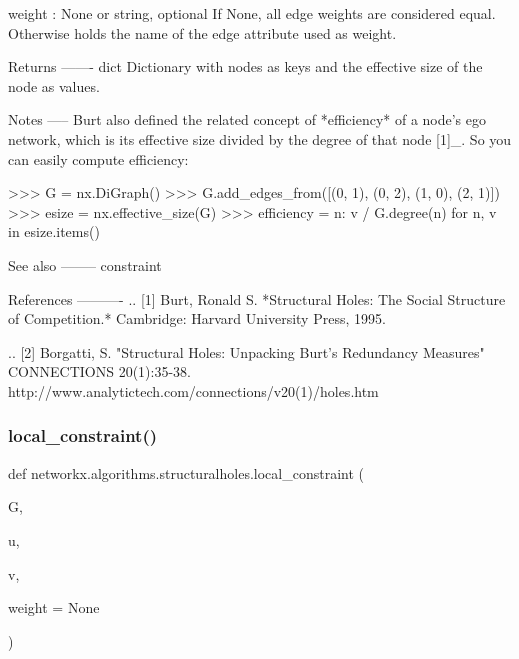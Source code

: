 \begin{DoxyVerb}
weight : None or string, optional
  If None, all edge weights are considered equal.
  Otherwise holds the name of the edge attribute used as weight.

Returns
-------
dict
    Dictionary with nodes as keys and the effective size of the node as values.

Notes
-----
Burt also defined the related concept of *efficiency* of a node's ego
network, which is its effective size divided by the degree of that
node [1]_. So you can easily compute efficiency:

>>> G = nx.DiGraph()
>>> G.add_edges_from([(0, 1), (0, 2), (1, 0), (2, 1)])
>>> esize = nx.effective_size(G)
>>> efficiency = {n: v / G.degree(n) for n, v in esize.items()}

See also
--------
constraint

References
----------
.. [1] Burt, Ronald S.
       *Structural Holes: The Social Structure of Competition.*
       Cambridge: Harvard University Press, 1995.

.. [2] Borgatti, S.
       "Structural Holes: Unpacking Burt's Redundancy Measures"
       CONNECTIONS 20(1):35-38.
       http://www.analytictech.com/connections/v20(1)/holes.htm\end{DoxyVerb}
 \mbox{\label{namespacenetworkx_1_1algorithms_1_1structuralholes_a0f8b873761a6f5741a63aec67fa7b346}} 
\subsubsection{\texorpdfstring{local\+\_\+constraint()}{local\_constraint()}}
{\footnotesize\ttfamily def networkx.\+algorithms.\+structuralholes.\+local\+\_\+constraint (\begin{DoxyParamCaption}\item[{}]{G,  }\item[{}]{u,  }\item[{}]{v,  }\item[{}]{weight = {\ttfamily None} }\end{DoxyParamCaption})}

